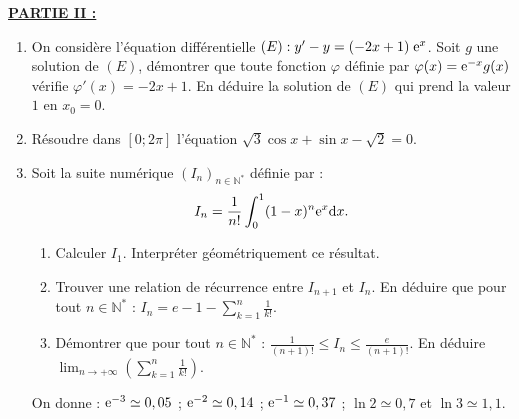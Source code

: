       \noindent \underline{\textbf{PARTIE II :}}
            \begin{enumerate}
                  \item On consid\`ere l'\'equation diff\'erentielle 
                        $(E) : y' - y = (-2x+1) \; \mathrm{e}^{x}$.
                        Soit $g$ une solution de $(E)$, d\'emontrer que toute fonction $\varphi$ d\'efinie par $\varphi(x) = \mathrm{e}^{-x} g(x)$ 
                        v\'erifie $\varphi'(x) = -2x+1$.
                        En d\'eduire la solution de $(E)$ qui prend la valeur $1$ en $x_0 = 0$.
                  \item R\'esoudre dans $[0 ; 2\pi]$ l'\'equation 
                        $\sqrt{3} \cos x + \sin x - \sqrt{2} = 0$.
                  \item Soit la suite num\'erique $(I_n)_{n\in\mathbb{N}^*}$ d\'efinie par :
                        \[
                              I_n = \frac{1}{n!} \int_{0}^{1} (1-x)^n \mathrm{e}^{x} \mathrm{d}x.
                        \]
                        \begin{enumerate}
                              \item Calculer $I_1$.
                                    Interpr\'eter g\'eom\'etriquement ce r\'esultat.
                              \item Trouver une relation de r\'ecurrence entre $I_{n+1}$ et $I_n$.
                                    En d\'eduire que pour tout $n\in\mathbb{N}^*$ : $I_n = e - 1 - \sum_{k=1}^{n} \frac{1}{k!}$.
                              \item D\'emontrer que pour tout $n\in\mathbb{N}^*$ : 
                                    $\displaystyle{
                                    \frac{1}{(n+1)!} \leq I_n \leq \frac{e}{(n+1)!}
                                    }.$
                                    En d\'eduire 
                                    $\displaystyle{
                                    \lim_{n\rightarrow+\infty} \left( \sum_{k=1}^{n} \frac{1}{k!} \right)
                                    }.$
                        \end{enumerate}
                  On donne : $\mathrm{e}^{-3} \simeq 0,05$ ; $\mathrm{e}^{-2} \simeq 0,14$ ; $\mathrm{e}^{-1} \simeq 0,37$ ; $\ln 2 \simeq 0,7$ et $\ln 3 \simeq 1,1$.
            \end{enumerate}
      





































